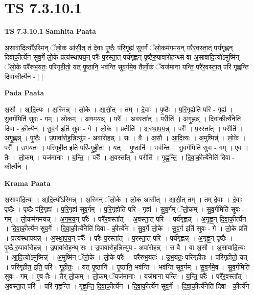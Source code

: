 \documentclass[17pt]{extarticle}
\begin{document}
\section{ TS 7.3.10.1 }

\textbf{TS 7.3.10.1 } \newline
\textbf{Samhita Paata} \newline

अ॒सावा॑दि॒त्यो᳚ऽस्मिन् ॅलो॒क आ॑सी॒त् तं दे॒वाः पृ॒ष्ठैः प॑रि॒गृह्य॑ सुव॒र्गं ॅलो॒कम॑गमय॒न् परै॑र॒वस्ता॒त् पर्य॑गृह्णन् दिवाकी॒र्त्ये॑न सुव॒र्गे लो॒के प्रत्य॑स्थापय॒न् परैः᳚ प॒रस्ता॒त् पर्य॑गृह्णन् पृ॒ष्ठैरु॒पावा॑रोह॒न्थ्स वा अ॒सावा॑दि॒त्यो॑ऽमुष्मि॑न् ॅलो॒के परै॑रुभ॒यतः॒ परि॑गृहीतो॒ यत् पृ॒ष्ठानि॒ भव॑न्ति सुव॒र्गमे॒व तैर्लो॒कं ॅयज॑माना यन्ति॒ परै॑र॒वस्ता॒त् परि॑ गृह्णन्ति दिवाकी॒र्त्ये॑न - [  ] \newline

\textbf{Pada Paata} \newline

अ॒सौ । आ॒दि॒त्यः । अ॒स्मिन्न् । लो॒के । आ॒सी॒त् । तम् । दे॒वाः । पृ॒ष्ठैः । प॒रि॒गृह्येति॑ परि - गृह्य॑ । सु॒व॒र्गमिति॑ सुवः - गम् । लो॒कम् । अ॒ग॒म॒य॒न्न् । परैः᳚ । अ॒वस्ता᳚त् । परीति॑ । अ॒गृ॒ह्ण॒न्न् । दि॒वा॒की॒र्त्ये॑नेति॑ दिवा - की॒र्त्ये॑न । सु॒व॒र्ग इति॑ सुवः - गे । लो॒के । प्रतीति॑ । अ॒स्था॒प॒य॒न्न् । परैः᳚ । प॒रस्ता᳚त् । परीति॑ । अ॒गृ॒ह्ण॒न्न् । पृ॒ष्ठैः । उ॒पावा॑रोह॒न्नित्यु॑प - अवा॑रोहन्न् । सः । वै । अ॒सौ । आ॒दि॒त्यः । अ॒मुष्मिन्न्॑ । लो॒के । परैः᳚ । उ॒भ॒यतः॑ । परि॑गृहीत॒ इति॒ परि॑-गृ॒ही॒तः॒ । यत् । पृ॒ष्ठानि॑ । भव॑न्ति । सु॒व॒र्गमिति॑ सुवः - गम् । ए॒व । तैः । लो॒कम् । यज॑मानाः । य॒न्ति॒ । परैः᳚ । अ॒वस्ता᳚त् । परीति॑ । गृ॒ह्ण॒न्ति॒ । दि॒वा॒की॒र्त्ये॑नेति॑ दिवा - की॒र्त्ये॑न ।  \newline


\textbf{Krama Paata} \newline

अ॒सावा॑दि॒त्यः । आ॒दि॒त्यो᳚ऽस्मिन्न् । अ॒स्मिन् ॅलो॒के । लो॒क आ॑सीत् । आ॒सी॒त् तम् । तम् दे॒वाः । दे॒वाः पृ॒ष्ठैः । पृ॒ष्ठैः प॑रि॒गृह्य॑ । प॒रि॒गृह्य॑ सुव॒र्गम् । प॒रि॒गृह्येति॑ परि - गृह्य॑ । सु॒व॒र्गम् ॅलो॒कम् । सु॒व॒र्गमिति॑ सुवः - गम् । लो॒कम॑गमयन्न् । अ॒ग॒म॒य॒न् परैः᳚ । परै॑र॒वस्ता᳚त् । अ॒वस्ता॒त् परि॑ । पर्य॑गृह्णन्न् । अ॒गृ॒ह्ण॒न् दि॒वा॒की॒र्त्ये॑न । दि॒वा॒की॒र्त्ये॑न सुव॒र्गे । दि॒वा॒की॒र्त्ये॑नेति॑ दिवा - की॒र्त्ये॑न । सु॒व॒र्गे लो॒के । सु॒व॒र्ग इति॑ सुवः - गे । लो॒के प्रति॑ । प्रत्य॑स्थापयन्न् । अ॒स्था॒प॒य॒न् परैः᳚ । परैः᳚ प॒रस्ता᳚त् । प॒रस्ता॒त् परि॑ । पर्य॑गृह्णन्न् । अ॒गृ॒ह्ण॒न् पृ॒ष्ठैः । पृ॒ष्ठै,रु॒पावा॑रोहन्न् । उ॒पावा॑रोह॒न्थ् सः । उ॒पावा॑रोह॒न्नित्यु॑प - अवा॑रोहन्न् । स वै । वा अ॒सौ । अ॒सावा॑दि॒त्यः । आ॒दि॒त्यो॑ऽमुष्मिन्न्॑ । अ॒मुष्मि॑न् ॅलो॒के । लो॒के परैः᳚ । परै॑रुभ॒यतः॑ । उ॒भ॒यतः॒ परि॑गृहीतः । परि॑गृहीतो॒ यत् । परि॑गृहीत॒ इति॒ परि॑ - गृ॒ही॒तः॒ । यत् पृ॒ष्ठानि॑ । पृ॒ष्ठानि॒ भव॑न्ति । भव॑न्ति सुव॒र्गम् । सु॒व॒र्गमे॒व । सु॒व॒र्गमिति॑ सुवः - गम् । ए॒व तैः । तैर् लो॒कम् । लो॒कम् ॅयज॑मानाः । यज॑माना यन्ति । य॒न्ति॒ परैः᳚ । परै॑र॒वस्ता᳚त् । अ॒वस्ता॒त् परि॑ । परि॑ गृह्णन्ति । गृ॒ह्ण॒न्ति॒ दि॒वा॒की॒र्त्ये॑न । दि॒वा॒की॒र्त्ये॑न सुव॒र्गे । दि॒वा॒की॒र्त्ये॑नेति॑ दिवा - की॒र्त्ये॑न \newline
\end{document}
